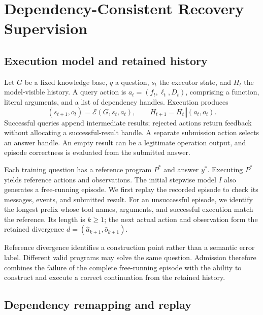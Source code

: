 \begin{table}[htbp]
 \centering\small
 \caption{Recovery-supervision sources and construction requirements.}
 \label{tab:related}
 \RecoveryRelatedTableEN
\end{table}

\section{Dependency-Consistent Recovery Supervision}

\subsection{Execution model and retained history}

Let $G$ be a fixed knowledge base, $q$ a question, $s_t$ the executor state, and $H_t$ the model-visible history. A query action is $a_t=(f_t,\ell_t,D_t)$, comprising a function, literal arguments, and a list of dependency handles. Execution produces
\begin{equation}
 (s_{t+1},o_t)=\mathcal{E}(G,s_t,a_t),\qquad
 H_{t+1}=H_t\mathbin{\Vert}(a_t,o_t).
\end{equation}
Successful queries append intermediate results; rejected actions return feedback without allocating a successful-result handle. A separate submission action selects an answer handle. An empty result can be a legitimate operation output, and episode correctness is evaluated from the submitted answer.

Each training question has a reference program $P^*$ and answer $y^*$. Executing $P^*$ yields reference actions and observations. The initial stepwise model $I$ also generates a free-running episode. We first replay the recorded episode to check its messages, events, and submitted result. For an unsuccessful episode, we identify the longest prefix whose tool names, arguments, and successful execution match the reference. Its length is $k\geq1$; the next actual action and observation form the retained divergence $d=(\hat a_{k+1},\hat o_{k+1})$.

Reference divergence identifies a construction point rather than a semantic error label. Different valid programs may solve the same question. Admission therefore combines the failure of the complete free-running episode with the ability to construct and execute a correct continuation from the retained history.

\subsection{Dependency remapping and replay}

